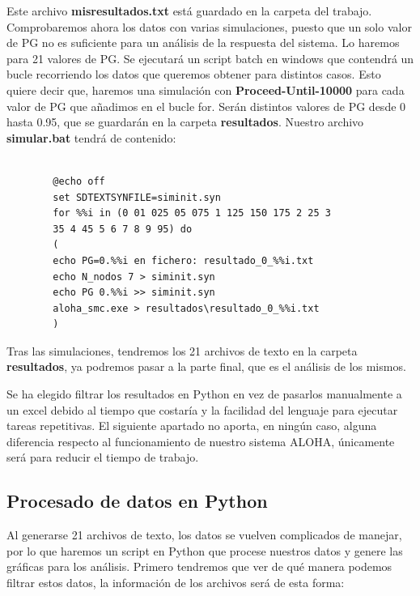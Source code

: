 \documentclass{article}
\begin{document}
Este archivo \textbf{ misresultados.txt} está guardado en la carpeta del trabajo. Comprobaremos ahora los datos con varias simulaciones, puesto que un solo valor de PG no es suficiente para un análisis de la respuesta del sistema. Lo haremos para 21 valores de PG. Se ejecutará un script batch en windows que contendrá un bucle recorriendo los datos que queremos obtener para distintos casos. Esto quiere decir que, haremos una simulación con \textbf{Proceed-Until-10000} para cada valor de PG que añadimos en el bucle for. Serán distintos valores de PG desde 0 hasta 0.95, que se guardarán en la carpeta \textbf{resultados}. Nuestro archivo \textbf{simular.bat} tendrá de contenido:
\begin{center} 
    \begin{verbatim}

        @echo off
        set SDTEXTSYNFILE=siminit.syn
        for %%i in (0 01 025 05 075 1 125 150 175 2 25 3
        35 4 45 5 6 7 8 9 95) do 
        (
        echo PG=0.%%i en fichero: resultado_0_%%i.txt
        echo N_nodos 7 > siminit.syn
        echo PG 0.%%i >> siminit.syn
        aloha_smc.exe > resultados\resultado_0_%%i.txt
        )

    \end{verbatim}
    \end{center} 
\quad

Tras las simulaciones, tendremos los 21 archivos de texto en la carpeta \textbf{resultados}, ya podremos pasar a la parte final, que es el análisis de los mismos. 

\quad

Se ha elegido filtrar los resultados en Python en vez de pasarlos manualmente a un excel debido al tiempo que costaría y la facilidad del lenguaje para ejecutar tareas repetitivas. El siguiente apartado no aporta, en ningún caso, alguna diferencia respecto al funcionamiento de nuestro sistema ALOHA, únicamente será para reducir el tiempo de trabajo.

\newpage

\subsection{Procesado de datos en Python}

Al generarse 21 archivos de texto, los datos se vuelven complicados de manejar, por lo que haremos un script en Python que procese nuestros datos y genere las gráficas para los análisis. Primero tendremos que ver de qué manera podemos filtrar estos datos, la información de los archivos será de esta forma:
\end{document}
